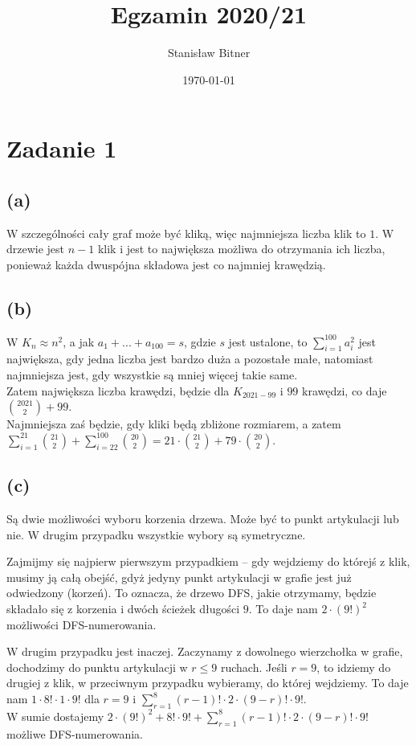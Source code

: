 \documentclass[12pt, a4paper]{article}
\title{Egzamin 2020/21}
\author{Stanisław Bitner}
\date{\today}
\begin{document}
\maketitle

\section*{Zadanie 1}
\subsection*{(a)}
W szczególności cały graf może być kliką, więc najmniejsza liczba klik to $1$.
W drzewie jest $n-1$ klik i jest to największa możliwa do otrzymania ich
liczba, ponieważ każda dwuspójna składowa jest co najmniej krawędzią.

\subsection*{(b)}
W $K_n \approx n^2$, a jak $a_1 + ... + a_{100} = s$, gdzie $s$ jest ustalone,
to $\sum_{i=1}^{100} a_i^2$ jest największa, gdy jedna liczba jest bardzo duża
a pozostałe małe, natomiast najmniejsza jest, gdy wszystkie są mniej więcej
takie same.\\ Zatem największa liczba krawędzi, będzie dla $K_{2021-99}$ i $99$
krawędzi, co daje $\binom{2021}{2} + 99$.\\ Najmniejsza zaś będzie, gdy kliki
będą zbliżone rozmiarem, a zatem\\ $\sum_{i=1}^{21} \binom{21}{2}
+ \sum_{i=22}^{100} \binom{20}{2} = 21\cdot \binom{21}{2} + 79 \cdot
\binom{20}{2}$.

\subsection*{(c)}
Są dwie możliwości wyboru korzenia drzewa. Może być to punkt artykulacji lub
nie. W drugim przypadku wszystkie wybory są symetryczne.

Zajmijmy się najpierw pierwszym przypadkiem -- gdy wejdziemy do którejś z klik,
musimy ją całą obejść, gdyż jedyny punkt artykulacji w grafie jest już
odwiedzony (korzeń). To oznacza, że drzewo DFS, jakie otrzymamy, będzie
składało się z korzenia i dwóch ścieżek długości $9$. To daje nam $2 \cdot
(9!)^2$ możliwości DFS-numerowania.

W drugim przypadku jest inaczej. Zaczynamy z dowolnego wierzchołka w grafie,
dochodzimy do punktu artykulacji w $r \le 9$ ruchach. Jeśli $r=9$, to idziemy
do drugiej z klik, w przeciwnym przypadku wybieramy, do której wejdziemy. To
daje nam $1 \cdot 8! \cdot 1 \cdot 9!$ dla $r=9$ i $\sum_{r=1}^8 (r-1)! \cdot
2 \cdot (9 - r)! \cdot 9!$.\\ W sumie dostajemy $2 \cdot (9!)^2 + 8! \cdot 9!
+ \sum_{r=1}^8 (r-1)! \cdot 2 \cdot (9 - r)! \cdot 9!$ możliwe DFS-numerowania.
\end{document}

